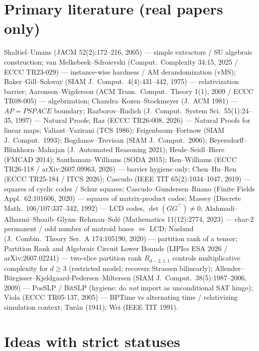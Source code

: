 \documentclass[11pt]{article}
\begin{document}
\section*{Primary literature (real papers only)}
Shaltiel--Umans (JACM 52(2):172--216, 2005) --- simple extractors / SU algebraic construction;
van Melkebeek--Sdroievski (Comput.\ Complexity 34:15, 2025 / ECCC TR23-029) --- instance-wise
hardness / AM derandomization (vMS);
Baker--Gill--Solovay (SIAM J.\ Comput.\ 4(4):431--442, 1975) --- relativization barrier;
Aaronson--Wigderson (ACM Trans.\ Comput.\ Theory 1(1), 2009 / ECCC TR08-005) --- algebrization;
Chandra--Kozen--Stockmeyer (J.\ ACM 1981) --- $AP=PSPACE$ boundary;
Razborov--Rudich (J.\ Comput.\ System Sci.\ 55(1):24--35, 1997) --- Natural Proofs;
Raz (ECCC TR26-008, 2026) --- Natural Proofs for linear maps;
Valiant--Vazirani (TCS 1986); Feigenbaum--Fortnow (SIAM J.\ Comput.\ 1993);
Bogdanov--Trevisan (SIAM J.\ Comput.\ 2006);
Beyersdorff--Blinkhorn--Mahajan (J.\ Automated Reasoning 2021);
Heule--Seidl--Biere (FMCAD 2014); Santhanam--Williams (SODA 2015);
Ren--Williams (ECCC TR26-118 / arXiv:2607.09963, 2026) --- barrier hygiene only;
Chen--Hu--Ren (ECCC TR25-184 / ITCS 2026); Cascudo (IEEE TIT 65(2):1034--1047, 2019) ---
squares of cyclic codes / Schur squares;
Cascudo--Gundersen--Ruano (Finite Fields Appl.\ 62:101606, 2020) --- squares of matrix-product codes;
Massey (Discrete Math.\ 106/107:337--342, 1992) --- LCD codes, $\det(GG^\top)\neq 0$;
Alahmadi--Alhazmi--Shoaib--Glynn--Rehman--Sol\'e (Mathematics 11(12):2774, 2023) ---
char-$2$ permanent / odd number of matroid bases $\Leftrightarrow$ LCD;
Naslund (J.\ Combin.\ Theory Ser.\ A 174:105190, 2020) --- partition rank of a tensor;
Partition Rank and Algebraic Circuit Lower Bounds (LIPIcs ESA 2026 / arXiv:2607.02241) ---
two-slice partition rank $R_{d-2,1,1}$ controls multiplicative complexity for $d\ge 3$
(restricted model; recovers Strassen bilinearly);
Allender--B\"urgisser--Kjeldgaard-Pedersen--Miltersen (SIAM J.\ Comput.\ 38(5):1987--2006, 2009)
--- PosSLP / BitSLP (hygiene: do \emph{not} import as unconditional SAT hinge);
Viola (ECCC TR05-137, 2005) --- BPTime vs alternating time / relativizing simulation context;
Tur\'an (1941); Wei (IEEE TIT 1991).

\section*{Ideas with strict statuses}
\end{document}
